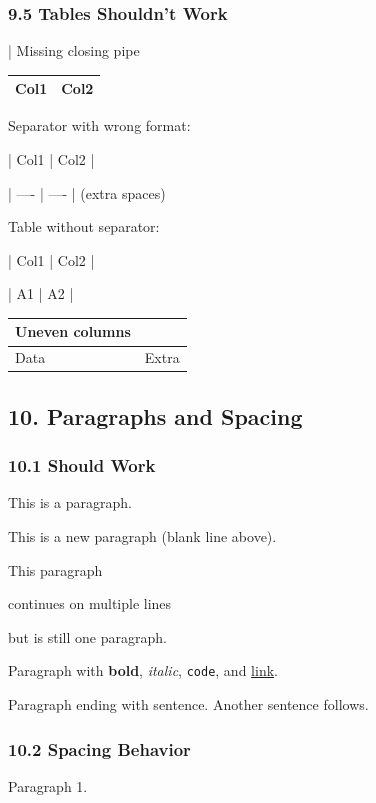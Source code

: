 \documentclass{article}
\begin{document}
\subsubsection{ 9.5 Tables Shouldn't Work}

| Missing closing pipe

\begin{tabular}{ll}
\hline
 Col1  &  Col2  \\
\hline
\hline
\end{tabular}

Separator with wrong format:

| Col1 | Col2 |

| ---- | ---- |  (extra spaces)

Table without separator:

| Col1 | Col2 |

| A1 | A2 |

\begin{tabular}{ll}
\hline
 Uneven columns  \\
\hline
 Data  &  Extra  \\
\hline
\end{tabular}

\noindent\hrulefill

\subsection{ 10. Paragraphs and Spacing}

\subsubsection{ 10.1 Should Work}

This is a paragraph.

This is a new paragraph (blank line above).

This paragraph

continues on multiple lines

but is still one paragraph.

Paragraph with \textbf{bold}, \emph{italic}, \texttt{code}, and \href{https://example.com}{link}.

Paragraph ending with sentence. Another sentence follows.

\subsubsection{ 10.2 Spacing Behavior}

Paragraph 1.
\end{document}
